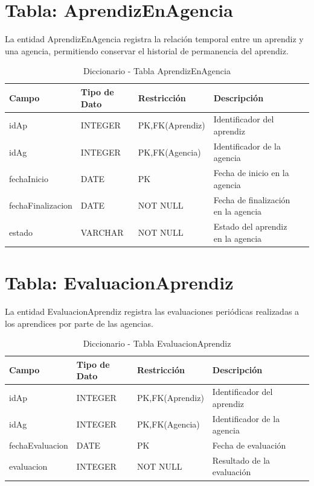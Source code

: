 \documentclass[12pt,a4paper,spanish,oneside]{report}
\begin{document}
\section{Tabla: AprendizEnAgencia}
La entidad AprendizEnAgencia registra la relación temporal entre un aprendiz y
una agencia, permitiendo conservar el historial de permanencia del aprendiz.
\begin{table}[H]
\centering
\caption{Diccionario - Tabla AprendizEnAgencia}
\begin{tabular}{|l|l|l|l|l|}
\hline
\textbf{Campo} & \textbf{Tipo de Dato} & \textbf{Restricción} & \textbf{Descripción} \\
\hline
idAp & INTEGER & PK,FK(Aprendiz) & Identificador del aprendiz \\
\hline
idAg & INTEGER & PK,FK(Agencia) & Identificador de la agencia \\
\hline
fechaInicio & DATE & PK & Fecha de inicio en la agencia \\
\hline
fechaFinalizacion & DATE & NOT NULL & Fecha de finalización en la agencia \\
\hline
estado & VARCHAR & NOT NULL & Estado del aprendiz en la agencia \\
\hline
\end{tabular}
\end{table}

\section{Tabla: EvaluacionAprendiz}
La entidad EvaluacionAprendiz registra las evaluaciones periódicas realizadas a los aprendices por parte de las agencias.
\begin{table}[H]
\centering
\caption{Diccionario - Tabla EvaluacionAprendiz}
\begin{tabular}{|l|l|l|l|l|}
\hline
\textbf{Campo} & \textbf{Tipo de Dato} & \textbf{Restricción} & \textbf{Descripción} \\
\hline
idAp & INTEGER & PK,FK(Aprendiz) & Identificador del aprendiz \\
\hline
idAg & INTEGER & PK,FK(Agencia) & Identificador de la agencia \\
\hline
fechaEvaluacion & DATE & PK & Fecha de evaluación \\
\hline
evaluacion & INTEGER & NOT NULL & Resultado de la evaluación\\
\hline
\end{tabular}
\end{table}
\end{document}
